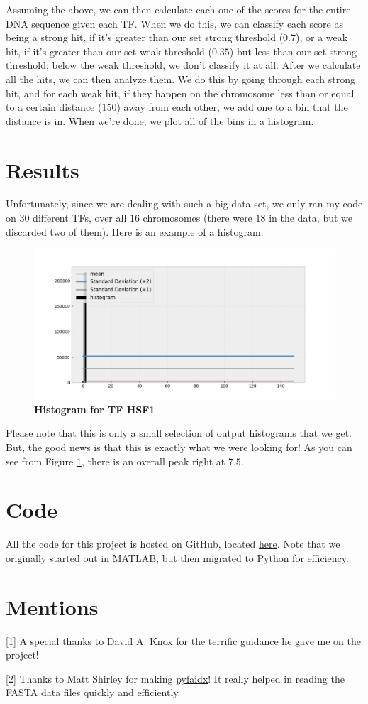 \documentclass{article}
\newcommand{\tab}{\hspace{9mm}}
\begin{document}
\tab Assuming the above, we can then calculate each one of the scores for the entire DNA sequence given each TF. When we do this, we can classify each score as being a strong hit, if it’s greater than our set strong threshold ($0.7$), or a weak hit, if it’s greater than our set weak threshold ($0.35$) but less than our set strong threshold; below the weak threshold, we don’t classify it at all. After we calculate all the hits, we can then analyze them. We do this by going through each strong hit, and for each weak hit, if they happen on the chromosome less than or equal to a certain distance ($150$) away from each other, we add one to a bin that the distance is in. When we’re done, we plot all of the bins in a histogram.

\section{Results}
Unfortunately, since we are dealing with such a big data set, we only ran my code on $30$ different TFs, over all $16$ chromosomes (there were $18$ in the data, but we discarded two of them). Here is an example of a histogram:
\begin{figure}[H]
  \centering
  \includegraphics[scale=0.29]{HistHSF1.png}
  \caption{\textbf{Histogram for TF HSF1}}
  \label{fig:histhsf1}
\end{figure}
Please note that this is only a small selection of output histograms that we get. But, the good news is that this is exactly what we were looking for! As you can see from Figure \ref{fig:histhsf1}, there is an overall peak right at $7.5$.
\section{Code}
All the code for this project is hosted on GitHub, located \href{https://github.com/johnletey/A-Study-of-Transcription-and-Its-Affects}{here}. Note that we originally started out in MATLAB, but then migrated to Python for efficiency.
\section{Mentions}
\small

\footnotesize{[1] A special thanks to David A. Knox for the terrific guidance he gave me on the project!}

\footnotesize{[2] Thanks to Matt Shirley for making \href{https://github.com/mdshw5/pyfaidx}{pyfaidx}! It really helped in reading the FASTA data files quickly and efficiently.}
\end{document}
